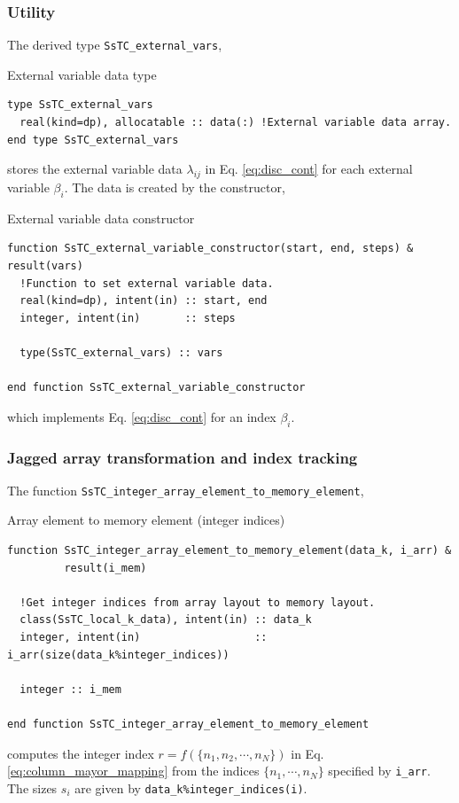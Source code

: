 \documentclass[10pt,a4paper]{article}
\begin{document}
\subsubsection{Utility}
The derived type \verb|SsTC_external_vars|,
\begin{codebox}{External variable data type}
\begin{lstlisting}[caption={Derived type ``external variables".},captionpos=b]
type SsTC_external_vars
  real(kind=dp), allocatable :: data(:) !External variable data array.
end type SsTC_external_vars
\end{lstlisting}
\end{codebox}
stores the external variable data $\lambda_{ij}$ in Eq. \eqref{eq:disc_cont} for each external variable $\beta_i$. The data is created by the constructor,
\begin{codebox}{External variable data constructor}
\begin{lstlisting}[caption={Interface of ``external variable constructor".},captionpos=b]
function SsTC_external_variable_constructor(start, end, steps) &
result(vars)
  !Function to set external variable data.
  real(kind=dp), intent(in) :: start, end
  integer, intent(in)       :: steps

  type(SsTC_external_vars) :: vars

end function SsTC_external_variable_constructor
\end{lstlisting}
\end{codebox}
which implements Eq. \eqref{eq:disc_cont} for an index $\beta_i$.
\subsubsection{Jagged array transformation and index tracking}

The function \verb|SsTC_integer_array_element_to_memory_element|,
\begin{codebox}{Array element to memory element (integer indices)}
\begin{lstlisting}[caption={Interface of ``integer array element to memory element".},captionpos=b]
function SsTC_integer_array_element_to_memory_element(data_k, i_arr) &
         result(i_mem)

  !Get integer indices from array layout to memory layout.
  class(SsTC_local_k_data), intent(in) :: data_k
  integer, intent(in)                  :: i_arr(size(data_k%integer_indices))

  integer :: i_mem

end function SsTC_integer_array_element_to_memory_element
\end{lstlisting}
\end{codebox}
computes the integer index $r = f(\{n_1, n_2, \cdots, n_N\})$ in Eq. \eqref{eq:column_mayor_mapping} from the indices $\{n_1, \cdots, n_N\}$ specified by \verb|i_arr|. The sizes $s_i$ are given by \verb|data_k%integer_indices(i)|.
\end{document}
